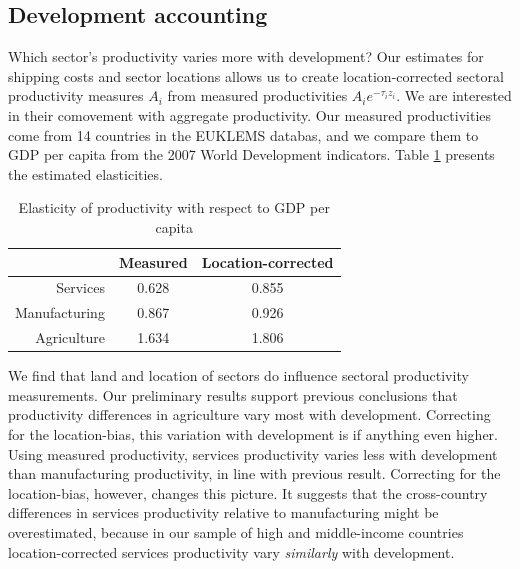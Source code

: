 \documentclass[12pt]{article}
\begin{document}
\subsection{Development accounting}

Which sector's productivity varies more with development? Our estimates for shipping costs and sector locations allows us to create location-corrected sectoral productivity measures $A_i$ from measured productivities $A_ie^{-\tau_iz_i}$. We are interested in their comovement with aggregate productivity. Our measured productivities come from 14 countries in the EUKLEMS databas, and we compare them to GDP per capita from the 2007 World Development indicators. Table \ref{tab:dev_acc} presents the estimated elasticities. 

\begin{table}[h!]
  \centering
  \caption{Elasticity of productivity with respect to GDP per capita}
    \begin{tabular}{rcc}
    \toprule
    \textbf{} & \textbf{Measured} & \textbf{Location-corrected} \\
    \midrule
    Services & 0.628 & 0.855 \\
    Manufacturing & 0.867 & 0.926 \\
    Agriculture & 1.634 & 1.806 \\
    \bottomrule
    \end{tabular}%
  \label{tab:dev_acc}%
\end{table}%
  
We find that land and location of sectors do influence sectoral productivity measurements. Our preliminary results support previous conclusions that productivity differences in agriculture vary most with development. Correcting for the location-bias, this variation with development is if anything even higher. Using measured productivity, services productivity varies less with development than manufacturing productivity, in line with previous result. Correcting for the location-bias, however, changes this picture. It suggests that the cross-country differences in services productivity relative to manufacturing might be overestimated, because in our sample of high and middle-income countries location-corrected services productivity vary \emph{similarly} with development.
\end{document}
